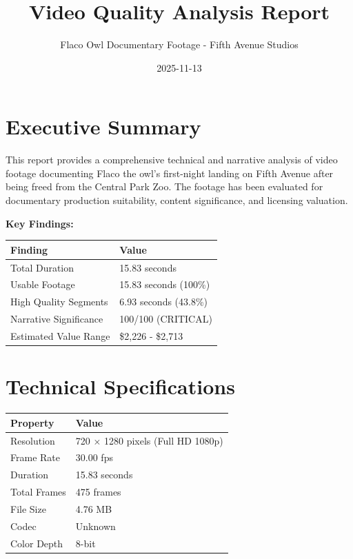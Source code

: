 \documentclass[
  11pt,
]{article}
\title{Video Quality Analysis Report}
\subtitle{Flaco Owl Documentary Footage - Fifth Avenue Studios}
\author{}
\date{2025-11-13}
\begin{document}
\maketitle
\ifdefined\Shaded\renewenvironment{Shaded}{\begin{tcolorbox}[sharp corners, breakable, boxrule=0pt, frame hidden, borderline west={3pt}{0pt}{shadecolor}, interior hidden, enhanced]}{\end{tcolorbox}}\fi

\hypertarget{executive-summary}{%
\section{Executive Summary}\label{executive-summary}}

This report provides a comprehensive technical and narrative analysis of
video footage documenting Flaco the owl's first-night landing on Fifth
Avenue after being freed from the Central Park Zoo. The footage has been
evaluated for documentary production suitability, content significance,
and licensing valuation.

\textbf{Key Findings:}

\begin{longtable}[]{@{}ll@{}}
\toprule\noalign{}
Finding & Value \\
\midrule\noalign{}
\endhead
\bottomrule\noalign{}
\endlastfoot
Total Duration & 15.83 seconds \\
Usable Footage & 15.83 seconds (100\%) \\
High Quality Segments & 6.93 seconds (43.8\%) \\
Narrative Significance & 100/100 (CRITICAL) \\
Estimated Value Range & \$2,226 - \$2,713 \\
\end{longtable}

\hypertarget{technical-specifications}{%
\section{Technical Specifications}\label{technical-specifications}}

\begin{longtable}[]{@{}ll@{}}
\toprule\noalign{}
Property & Value \\
\midrule\noalign{}
\endhead
\bottomrule\noalign{}
\endlastfoot
Resolution & 720 × 1280 pixels (Full HD 1080p) \\
Frame Rate & 30.00 fps \\
Duration & 15.83 seconds \\
Total Frames & 475 frames \\
File Size & 4.76 MB \\
Codec & Unknown \\
Color Depth & 8-bit \\
\end{longtable}
\end{document}
